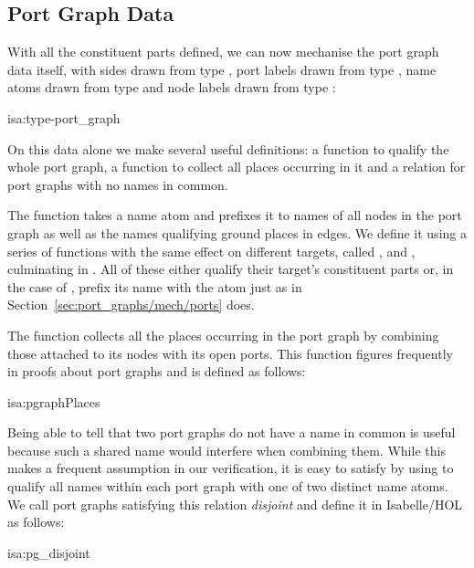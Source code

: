 \documentclass[class=smolathesis,crop=false]{standalone}
\begin{document}
\subsection{Port Graph Data}
\label{sec:port_graphs/mech/data}

With all the constituent parts defined, we can now mechanise the port graph data itself, with sides drawn from type , port labels drawn from type , name atoms drawn from type  and node labels drawn from type :
\begin{isadef}{isa:type-port_graph}
  
\end{isadef}

On this data alone we make several useful definitions: a function to qualify the whole port graph, a function to collect all places occurring in it and a relation for port graphs with no names in common.

The function  takes a name atom and prefixes it to names of all nodes in the port graph as well as the names qualifying ground places in edges.
We define it using a series of functions with the same effect on different targets, called ,  and , culminating in .
All of these either qualify their target's constituent parts or, in the case of , prefix its name with the atom just as  in Section~\ref{sec:port_graphs/mech/ports} does.

The function  collects all the places occurring in the port graph by combining those attached to its nodes with its open ports.
This function figures frequently in proofs about port graphs and is defined as follows:
\pagebreak
\begin{isadef}{isa:pgraphPlaces}
  
\end{isadef}

Being able to tell that two port graphs do not have a name in common is useful because such a shared name would interfere when combining them.
While this makes a frequent assumption in our verification, it is easy to satisfy by using  to qualify all names within each port graph with one of two distinct name atoms.
We call port graphs satisfying this relation \emph{disjoint} and define it in Isabelle/HOL as follows:
\begin{isadef}{isa:pg_disjoint}
  
\end{isadef}
\end{document}
